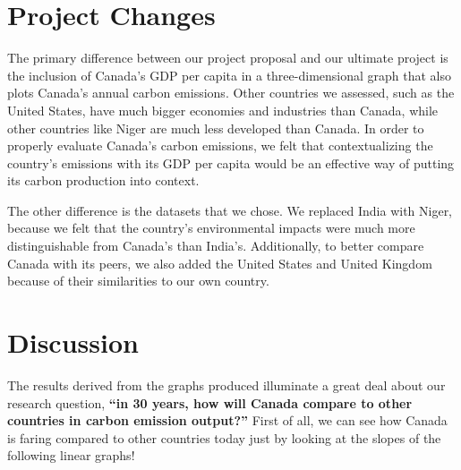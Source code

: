 \documentclass[fontsize=11pt]{article}
\begin{document}
    \section*{Project Changes}
    The primary difference between our project proposal and our ultimate project is the inclusion of Canada's GDP per capita in a three-dimensional graph that also plots Canada's annual carbon emissions. Other countries we assessed, such as the United States, have much bigger economies and industries than Canada, while other countries like Niger are much less developed than Canada. In order to properly evaluate Canada's carbon emissions, we felt that contextualizing the country's emissions with its GDP per capita would be an effective way of putting its carbon production into context.

    The other difference is the datasets that we chose. We replaced India with Niger, because we felt that the country's environmental impacts were much more distinguishable from Canada's than India's. Additionally, to better compare Canada with its peers, we also added the United States and United Kingdom because of their similarities to our own country.

    \section*{Discussion}
    The results derived from the graphs produced illuminate a great deal about our research question, \textbf{“in 30 years, how will Canada compare to other countries in carbon emission output?”} First of all, we can see how Canada is faring compared to other countries today just by looking at the slopes of the following linear graphs!
\end{document}
